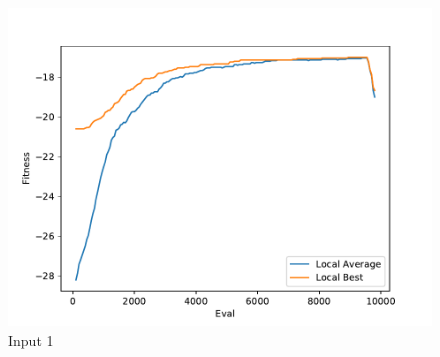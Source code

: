 \documentclass{standalone}
\begin{document}
\begin{figure}[!htb]
	\caption{Input 1}
	\label{fig:graph_1064}
	\includegraphics[width=\textwidth]{../graphs/graphs/1064.pdf}
\end{figure}
\end{document}
